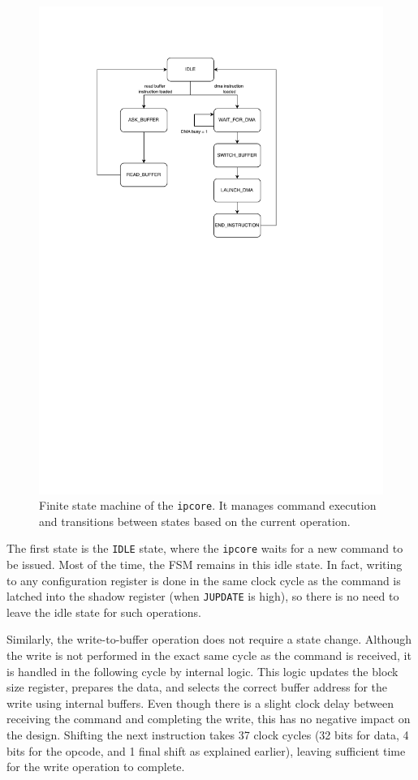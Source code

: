 \documentclass[a4paper,11pt,oneside]{report}
\begin{document}
\begin{figure}[H]
    \centering
    \includegraphics[width=0.9\linewidth]{figures/ipcore_fsm.pdf}
    \caption{Finite state machine of the \texttt{ipcore}. It manages command execution and transitions between states based on the current operation.}
    \label{fig:ipcore_fsm}
\end{figure}

The first state is the \texttt{IDLE} state, where the \texttt{ipcore} waits for a new command to be issued.
Most of the time, the FSM remains in this idle state. In fact, writing to any configuration register is done
in the same clock cycle as the command is latched into the shadow register (when \texttt{JUPDATE} is high),
so there is no need to leave the idle state for such operations.

Similarly, the write-to-buffer operation does not require a state change.
Although the write is not performed in the exact same cycle as the command is received,
it is handled in the following cycle by internal logic. This logic updates the block size register,
prepares the data, and selects the correct buffer address for the write using internal buffers.
Even though there is a slight clock delay between receiving the command and completing the write,
this has no negative impact on the design. Shifting the next instruction takes 37 clock cycles
(32 bits for data, 4 bits for the opcode, and 1 final shift as explained earlier),
leaving sufficient time for the write operation to complete.
\end{document}
